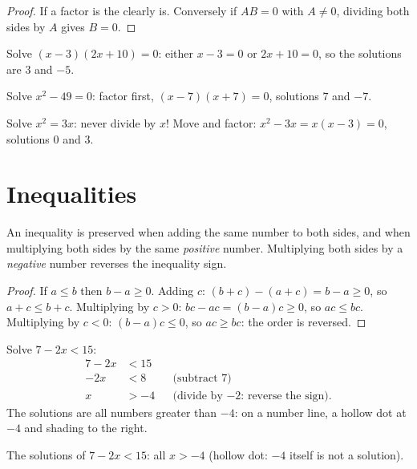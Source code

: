 \begin{proof}
If a factor is  the  clearly is. Conversely if $A B = 0$ with
$A \neq 0$, dividing both sides by $A$ gives $B = 0$.
\end{proof}

\begin{example}\label{ex:g9:algebra:zeroproduct}
Solve $(x - 3)(2x + 10) = 0$: either $x - 3 = 0$ or $2x + 10 = 0$, so the
solutions are $3$ and $-5$.

Solve $x^2 - 49 = 0$: factor first, $(x-7)(x+7) = 0$, solutions $7$ and
$-7$.

Solve $x^2 = 3x$: never divide by $x$! Move and factor:
$x^2 - 3x = x(x - 3) = 0$, solutions $0$ and $3$.
\end{example}

\section{Inequalities}

\begin{proposition}\label{prop:g9:algebra:ineq}
An inequality is preserved when adding the same number to both sides, and
when multiplying both sides by the same \emph{positive} number.
Multiplying both sides by a \emph{negative} number reverses the
inequality sign.
\end{proposition}

\begin{proof}
If $a \leq b$ then $b - a \geq 0$. Adding $c$: $(b+c) - (a+c) = b - a
\geq 0$, so $a + c \leq b + c$. Multiplying by $c > 0$:
$bc - ac = (b-a)c \geq 0$, so $ac \leq bc$. Multiplying by $c < 0$:
$(b-a)c \leq 0$, so $ac \geq bc$: the order is reversed.
\end{proof}

\begin{example}\label{ex:g9:algebra:ineq}
Solve $7 - 2x < 15$:
\begin{align*}
7 - 2x &< 15 \\
-2x &< 8 && \text{(subtract 7)} \\
x &> -4 && \text{(divide by $-2$: reverse the sign).}
\end{align*}
The solutions are all numbers greater than $-4$: on a number line, a
hollow dot at $-4$ and shading to the right.
\end{example}

\begin{omfigure}

{\small The solutions of $7 - 2x < 15$: all $x > -4$ (hollow dot: $-4$
itself is not a solution).}
\end{omfigure}

